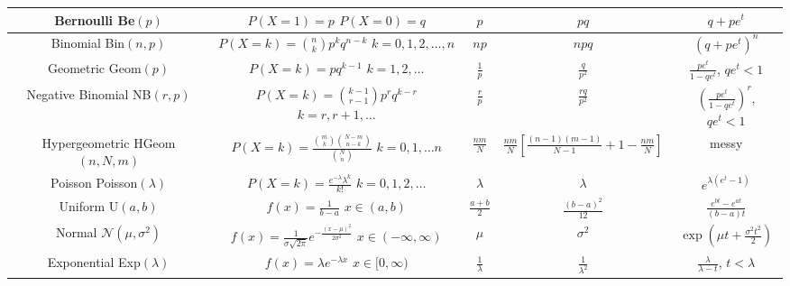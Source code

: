 \documentclass{article}
\begin{document}
\begin{center}
\begin{tabular}{c|c|c|c|c}
\makecell{Bernoulli \\ Be$(p)$} & \makecell{$P(X=1) = p$\\ $P(X=0)=q$} & $p$ & $pq$ & $q+pe^t$\\
\hline
\makecell{Binomial \\ Bin$(n,p)$} & \makecell{$P(X=k) = {n \choose k}p^kq^{n-k}$ \\ $k=0,1,2,\dots, n$} & $np$ & $npq$ & $(q+pe^t)^n$\\
\hline
\makecell{Geometric \\ Geom$(p)$} & \makecell{$P(X=k) = pq^{k-1}$ \\ $k=1,2,\dots$} & $\frac{1}{p}$ & $\frac{q}{p^2}$ &\makecell{$\frac{pe^t}{1-qe^t}$, \\ $qe^t<1$}\\
\hline
\makecell{Negative Binomial \\ NB$(r,p)$} & \makecell{$P(X=k) = {k-1 \choose r-1}p^rq^{k-r}$ \\ $k=r,r+1,\dots$} & $\frac{r}{p}$ & $\frac{rq}{p^2}$ & \makecell{$\left(\frac{pe^t}{1-qe^t}\right)^r$, \\ $qe^t<1$}\\
\hline
\makecell{Hypergeometric \\ HGeom$(n,N,m)$} & \makecell{$P(X=k) = \frac{{m \choose k}{N-m \choose n-k}}{{N\choose n}}$ \\ $k=0,1,\dots n$} & $\frac{nm}{N}$ & $\frac{nm}{N}\left[\frac{(n-1)(m-1)}{N-1} + 1 - \frac{nm}{N}\right] $ & messy \\
\hline
\makecell{Poisson \\ Poisson$(\lambda)$} & \makecell{$P(X=k) = \frac{e^{-\lambda}\lambda^k}{k!}$ \\ $k=0,1,2,\dots$} & $\lambda$ & $\lambda$ & $e^{\lambda(e^t-1)}$\\
\hline
\hline
\makecell{Uniform \\ U$(a,b)$} & \makecell{$f(x)=\frac{1}{b-a}$ \\ $x \in (a,b)$} & $\frac{a+b}{2}$ & $\frac{(b-a)^2}{12}$ & $\frac{e^{bt}-e^{at}}{(b-a)t}$\\
\hline
\makecell{Normal \\ $\mathcal{N}(\mu,\sigma^2)$} & \makecell{$f(x) = \frac{1}{\sigma \sqrt{2\pi}} e^{-\frac{(x-\mu)^2}{2\sigma^2}}$ \\ $x \in (-\infty,\infty)$} & $\mu$ & $\sigma^2$ & $\exp\left( \mu t+ \frac{\sigma^2t^2}{2}\right)$\\
\hline
\makecell{Exponential \\ Exp$(\lambda)$} & \makecell{$f(x) = \lambda e^{-\lambda x}$ \\ $x \in [0,\infty)$} & $\frac{1}{\lambda}$ & $\frac{1}{\lambda^2}$ & \makecell{$\frac{\lambda}{\lambda-t}$,\\ $t < \lambda$}\\

\end{tabular}
\end{center}
\end{document}
